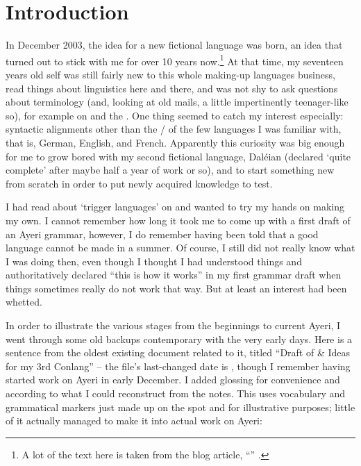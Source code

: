 \chapter{Introduction}

In December 2003, the idea for a new fictional language was born, an idea that 
turned out to stick with me for over 10 years now.\footnote{A lot of the text 
here is taken from the blog article, ``'' 
\parencite{benung:happybirthday}.} At that time, my seventeen years old self 
was still fairly new to this whole making-up languages business, read things 
about linguistics here and there, and was not shy to ask questions about 
terminology (and, looking at old mails, a little impertinently teenager-like 
so), for example on  and the . One 
thing seemed to catch my interest especially: syntactic alignments other than 
the \Nom{}/\Acc{} of the few languages I was familiar with, that is, German, 
English, and French. Apparently this curiosity was big enough for me to grow 
bored with my second fictional language, Daléian (declared `quite complete' 
after maybe half a year of work or so), and to start something new from scratch 
in order to put newly acquired knowledge to test.

I had read about `trigger languages' on  and wanted to try my 
hands on making my own. I cannot remember how long it took me to come up with a 
first draft of an Ayeri grammar, however, I do remember having been told that a 
good language cannot be made in a summer. Of course, I still did not really 
know what I was doing then, even though I thought I had understood things and 
authoritatively declared ``this is how it works'' in my first grammar draft 
when things sometimes really do not work that way. But at least an interest had 
been whetted.

In order to illustrate the various stages from the beginnings to current Ayeri,
I went through some old backups contemporary with the very early days. 
Here is a sentence from the oldest existing document related to it, titled 
``Draft of \& Ideas for my 3rd Conlang'' -- the file's last-changed date is 
, though I remember having started work on Ayeri in early 
December. I added glossing for convenience and according to what I could 
reconstruct from the notes. This uses vocabulary and grammatical markers just 
made up on the spot and for illustrative purposes; little of it actually 
managed to make it into actual work on Ayeri:

